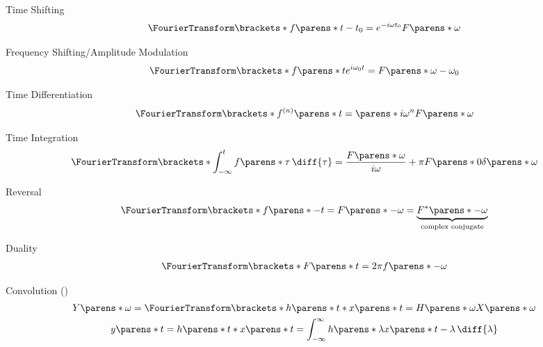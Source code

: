 \begin{multicols}{2}
\begin{CheatsheetEntryFrame}
\begin{center}
            Time Shifting
            \begin{gather*}
                \FourierTransform\brackets*{f\parens*{t - t_0}}
                = e^{-i \omega t_0} F\parens*{\omega}
            \end{gather*}

            Frequency Shifting/Amplitude Modulation
            \begin{gather*}
                \FourierTransform\brackets*{f\parens*{t} e^{i \omega_0 t}}
                = F\parens*{\omega - \omega_0}
            \end{gather*}

            Time Differentiation
            \begin{gather*}
                \FourierTransform\brackets*{f^{(n)}\parens*{t}}
                = \parens*{i \omega}^n F\parens*{\omega}
            \end{gather*}

            Time Integration
            \begin{gather*}
                \FourierTransform\brackets*{\int_{-\infty}^t f\parens*{\tau} \,\diff{\tau}}
                = \frac{F\parens*{\omega}}{i \omega}
                + \pi F\parens*{0} \delta\parens*{\omega}
            \end{gather*}

            Reversal
            \begin{gather*}
                \FourierTransform\brackets*{f\parens*{-t}}
                = F\parens*{-\omega}
                = \underbrace{F^*\parens*{-\omega}}_\text{\clap{complex conjugate}}
            \end{gather*}

            Duality
            \begin{gather*}
                \FourierTransform\brackets*{F\parens*{t}}
                = 2 \pi f \parens*{-\omega}
            \end{gather*}

            Convolution ()
            \begin{gather*}
                Y\parens*{\omega}
                = \FourierTransform\brackets*{h\parens*{t} * x\parens*{t}}
                = H\parens*{\omega} X\parens*{\omega}
                \\
                y\parens*{t}
                = h\parens*{t} * x\parens*{t}
                = \int_{-\infty}^\infty{
                    h\parens*{\lambda} x\parens*{t - \lambda} \,\diff{\lambda}
                }
            \end{gather*}
        \end{center}

    \end{CheatsheetEntryFrame}
    
\end{multicols}
